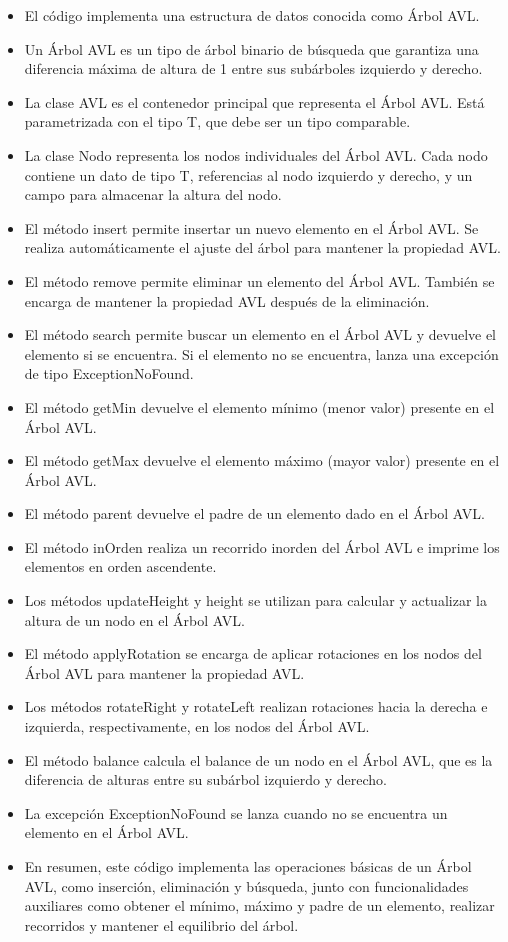\documentclass{article}
\begin{document}
		

	\begin{itemize}
		\item El código implementa una estructura de datos conocida como Árbol AVL.
		\item Un Árbol AVL es un tipo de árbol binario de búsqueda que garantiza una diferencia máxima de altura de 1 entre sus subárboles izquierdo y derecho.
		\item La clase AVL es el contenedor principal que representa el Árbol AVL. Está parametrizada con el tipo T, que debe ser un tipo comparable.
		\item La clase Nodo representa los nodos individuales del Árbol AVL. Cada nodo contiene un dato de tipo T, referencias al nodo izquierdo y derecho, y un campo para almacenar la altura del nodo.
		\item El método insert permite insertar un nuevo elemento en el Árbol AVL. Se realiza automáticamente el ajuste del árbol para mantener la propiedad AVL.
		\item El método remove permite eliminar un elemento del Árbol AVL. También se encarga de mantener la propiedad AVL después de la eliminación.
		\item El método search permite buscar un elemento en el Árbol AVL y devuelve el elemento si se encuentra. Si el elemento no se encuentra, lanza una excepción de tipo ExceptionNoFound.
		\item El método getMin devuelve el elemento mínimo (menor valor) presente en el Árbol AVL.
		\item El método getMax devuelve el elemento máximo (mayor valor) presente en el Árbol AVL.
		\item El método parent devuelve el padre de un elemento dado en el Árbol AVL.
		\item El método inOrden realiza un recorrido inorden del Árbol AVL e imprime los elementos en orden ascendente.
		\item Los métodos updateHeight y height se utilizan para calcular y actualizar la altura de un nodo en el Árbol AVL.
		\item El método applyRotation se encarga de aplicar rotaciones en los nodos del Árbol AVL para mantener la propiedad AVL.
		\item Los métodos rotateRight y rotateLeft realizan rotaciones hacia la derecha e izquierda, respectivamente, en los nodos del Árbol AVL.
		\item El método balance calcula el balance de un nodo en el Árbol AVL, que es la diferencia de alturas entre su subárbol izquierdo y derecho.
		\item La excepción ExceptionNoFound se lanza cuando no se encuentra un elemento en el Árbol AVL.
		\item En resumen, este código implementa las operaciones básicas de un Árbol AVL, como inserción, eliminación y búsqueda, junto con funcionalidades auxiliares como obtener el mínimo, máximo y padre de un elemento, realizar recorridos y mantener el equilibrio del árbol.
	\end{itemize}
\end{document}
